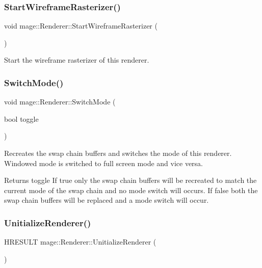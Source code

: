 \subsubsection{\texorpdfstring{Start\+Wireframe\+Rasterizer()}{StartWireframeRasterizer()}}
{\footnotesize\ttfamily void mage\+::\+Renderer\+::\+Start\+Wireframe\+Rasterizer (\begin{DoxyParamCaption}{ }\end{DoxyParamCaption})}

Start the wireframe rasterizer of this renderer. \hypertarget{classmage_1_1_renderer_a9004ab608659188900c808eacb5f873c}{}\label{classmage_1_1_renderer_a9004ab608659188900c808eacb5f873c} 
\subsubsection{\texorpdfstring{Switch\+Mode()}{SwitchMode()}}
{\footnotesize\ttfamily void mage\+::\+Renderer\+::\+Switch\+Mode (\begin{DoxyParamCaption}\item[{bool}]{toggle }\end{DoxyParamCaption})}

Recreates the swap chain buffers and switches the mode of this renderer. Windowed mode is switched to full screen mode and vice versa.

\begin{DoxyReturn}{Returns}
toggle If {\ttfamily true} only the swap chain buffers will be recreated to match the current mode of the swap chain and no mode switch will occurs. If {\ttfamily false} both the swap chain buffers will be replaced and a mode switch will occur. 
\end{DoxyReturn}
\hypertarget{classmage_1_1_renderer_a308beaf67b11128f02e87778b6a9c3c7}{}\label{classmage_1_1_renderer_a308beaf67b11128f02e87778b6a9c3c7} 
\subsubsection{\texorpdfstring{Unitialize\+Renderer()}{UnitializeRenderer()}}
{\footnotesize\ttfamily H\+R\+E\+S\+U\+LT mage\+::\+Renderer\+::\+Unitialize\+Renderer (\begin{DoxyParamCaption}{ }\end{DoxyParamCaption})\hspace{0.3cm}{\ttfamily [private]}}

